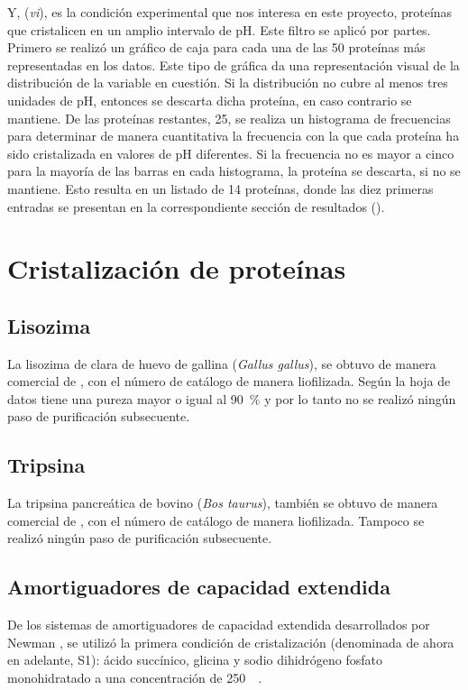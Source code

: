 Y, (\emph{vi}), es la condición experimental que nos interesa en este proyecto, proteínas que cristalicen en un amplio intervalo de pH. Este filtro se aplicó por partes. Primero se realizó un gráfico de caja para cada una de las 50 proteínas más representadas en los datos. Este tipo de gráfica da una representación visual de la distribución de la variable en cuestión. Si la distribución no cubre al menos tres unidades de pH, entonces se descarta dicha proteína, en caso contrario se mantiene. De las proteínas restantes, 25, se realiza un histograma de frecuencias para determinar de manera cuantitativa la frecuencia con la que cada proteína ha sido cristalizada en valores de pH diferentes. Si la frecuencia no es mayor a cinco para la mayoría de las barras en cada histograma, la proteína se descarta, si no se mantiene. Esto resulta en un listado de 14 proteínas, donde las diez primeras entradas se presentan en la correspondiente sección de resultados (). 

\section{Cristalización de proteínas}
\subsection{Lisozima}
La lisozima de clara de huevo de gallina (\emph{Gallus gallus}), se obtuvo de manera comercial de , con el número de catálogo  de manera liofilizada. Según la hoja de datos tiene una pureza mayor o igual al \SI{90}{\percent} y por lo tanto no se realizó ningún paso de purificación subsecuente.

\subsection{Tripsina}
La tripsina pancreática de bovino (\emph{Bos taurus}), también se obtuvo de manera comercial de , con el número de catálogo  de manera liofilizada. Tampoco se realizó ningún paso de purificación subsecuente.

\subsection{Amortiguadores de capacidad extendida}
De los sistemas de amortiguadores de capacidad extendida desarrollados por Newman \cite{Newman2004}, se utilizó la primera condición de cristalización (denominada de ahora en adelante, S1): ácido succínico, glicina y sodio dihidrógeno fosfato monohidratado a una concentración de \SI{250}{\milli\Molar}. 


